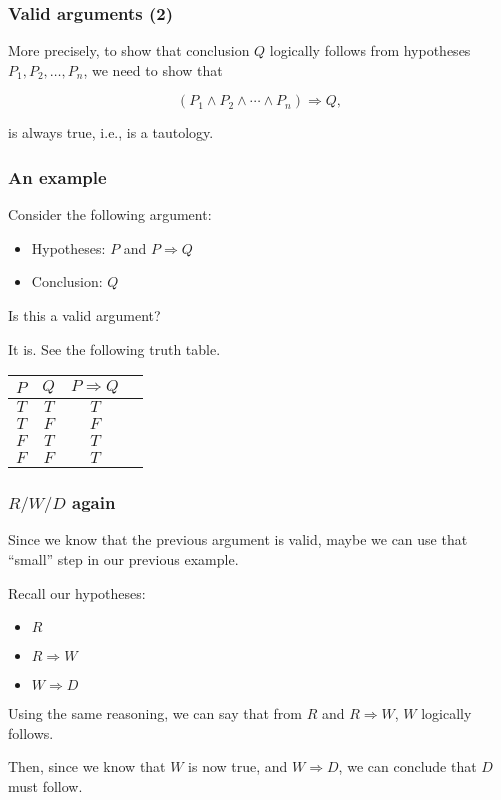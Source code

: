 \begin{frame}\frametitle{Valid arguments (2)}
  More precisely, to show that conclusion $Q$ logically follows from
  hypotheses $P_1,P_2,\ldots,P_n$, we need to show that

  \[ (P_1\wedge P_2\wedge \cdots\wedge P_n)\Rightarrow Q, \]

  is always true, i.e., is a tautology.
\end{frame}

\begin{frame}\frametitle{An example}
  Consider the following argument:

  \begin{itemize}
  \item Hypotheses: $P$ and $P\Rightarrow Q$
  \item Conclusion: $Q$
  \end{itemize}

  Is this a valid argument?
  \pause

  \vspace{0.2in}
  
  It is.  See the following truth table.
  
  \begin{tabular}{|c|c||c|c|}
    \hline
    $P$ & $Q$ & $P\Rightarrow Q$ \\
    \hline 
    $T$ & $T$ & $T$ \\
    $T$ & $F$ & $F$ \\
    $F$ & $T$ & $T$ \\
    $F$ & $F$ & $T$ \\
    \hline
  \end{tabular}
\end{frame}

\begin{frame}\frametitle{$R/W/D$ again}
  Since we know that the previous argument is valid, maybe we can use
  that ``small'' step in our previous example.

  Recall our hypotheses:
  \begin{itemize}
  \item $R$
  \item $R\Rightarrow W$
  \item $W\Rightarrow D$
  \end{itemize}

  \pause
  
  Using the same reasoning, we can say that from $R$ and $R\Rightarrow
  W$, $W$ logically follows.
  \pause
  
  Then, since we know that $W$ is now true, and $W\Rightarrow D$, we
  can conclude that $D$ must follow.
\end{frame}

